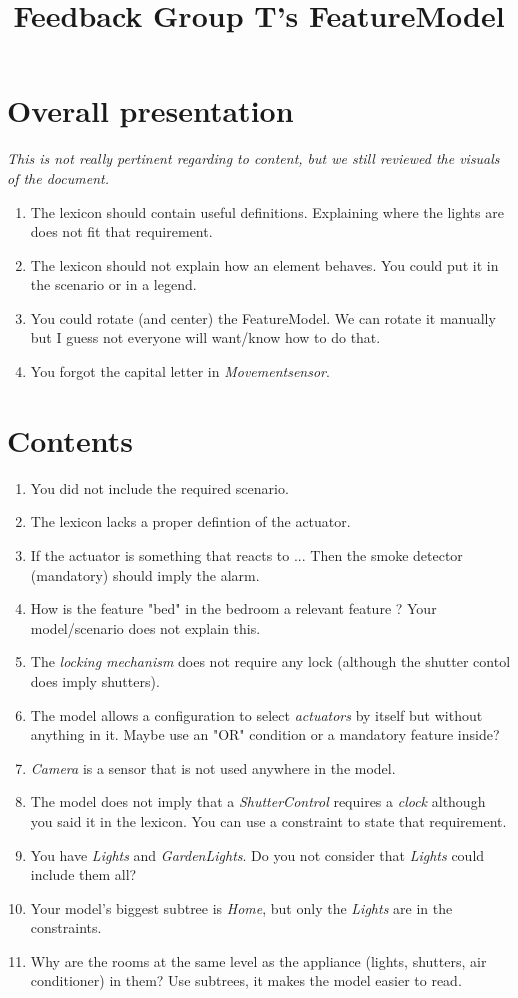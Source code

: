     \title{Feedback Group T's FeatureModel}
    \newpage

    \section{Overall presentation}
        \emph{This is not really pertinent regarding to content, but we still reviewed the visuals of the document.}
        \begin{enumerate}
            \item The lexicon should contain useful definitions. Explaining where the lights are does not fit that requirement.
            \item The lexicon should not explain how an element behaves. You could put it in the scenario or in a legend.
            \item You could rotate (and center) the FeatureModel. We can rotate it manually but I guess not everyone will want/know how to do that.
            \item You forgot the capital letter in \emph{Movementsensor}.

        \end{enumerate}

    \section{Contents}
        \begin{enumerate}
          \item You did not include the required scenario.
          \item The lexicon lacks a proper defintion of the actuator.
          \item If the actuator is something that reacts to ... Then the smoke detector (mandatory) should imply the alarm.
          \item How is the feature "bed" in the bedroom a relevant feature ? Your model/scenario does not explain this.
          \item The \emph{locking mechanism} does not require any lock (although the shutter contol does imply shutters).
          \item The model allows a configuration to select \emph{actuators} by itself but without anything in it. Maybe use an "OR" condition or a mandatory feature inside?
          \item \emph{Camera} is a sensor that is not used anywhere in the model.
          \item The model does not imply that a \emph{ShutterControl} requires a \emph{clock} although you said it in the lexicon. You can use a constraint to state that requirement.
          \item You have \emph{Lights} and \emph{GardenLights}. Do you not consider that \emph{Lights} could include them all?
          \item Your model's biggest subtree is \emph{Home}, but only the \emph{Lights} are in the constraints.
          \item Why are the rooms at the same level as the appliance (lights, shutters, air conditioner) in them? Use subtrees, it makes the model easier to read.
        \end{enumerate}


